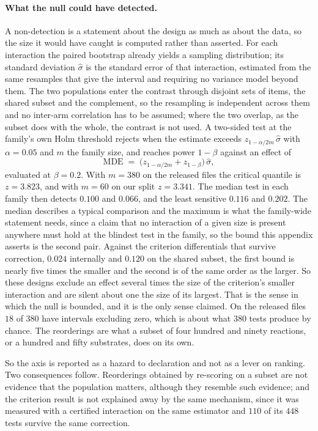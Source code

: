 \paragraph{What the null could have detected.} A non-detection is a statement about the design as
much as about the data, so the size it would have caught is computed rather than asserted. For each
interaction the paired bootstrap already yields a sampling distribution; its standard deviation
$\hat\sigma$ is the standard error of that interaction, estimated from the same resamples that give
the interval and requiring no variance model beyond them. The two populations enter the contrast
through disjoint sets of items, the shared subset and the complement, so the resampling is
independent across them and no inter-arm correlation has to be assumed; where the two overlap, as
the subset does with the whole, the contrast is not used. A two-sided test at the family's own Holm
threshold rejects when the estimate exceeds $z_{1-\alpha/2m}\,\hat\sigma$ with $\alpha=0.05$ and $m$
the family size, and reaches power $1-\beta$ against an effect of
\[
\mathrm{MDE} \;=\; \bigl(z_{1-\alpha/2m} + z_{1-\beta}\bigr)\,\hat\sigma ,
\]
evaluated at $\beta=0.2$. With $m=380$ on the released files the critical quantile is $z=3.823$, and
with $m=60$ on our split $z=3.341$. The median test in each family then detects $0.100$ and $0.066$,
and the least sensitive $0.116$ and $0.202$. The median describes a typical comparison and the
maximum is what the family-wide statement needs, since a claim that no interaction of a given size is
present anywhere must hold at the blindest test in the family, so the bound this appendix asserts is
the second pair. Against the criterion differentials that survive
correction, $0.024$ internally and $0.120$ on the shared subset, the first bound is nearly five
times the smaller and the second is of the same order as the larger. So these designs exclude an
effect several times the size of the criterion's smaller interaction and are silent about one the
size of its largest. That is the sense in which the null is bounded, and it is the only sense
claimed. On the released files $18$ of $380$ have intervals
excluding zero, which is about what $380$ tests produce by chance. The reorderings are what a subset
of four hundred and ninety reactions, or a hundred and fifty substrates, does on its own.

So the axis is reported as a hazard to declaration and not as a lever on ranking. Two consequences follow. Reorderings obtained by re-scoring on a subset are not evidence that the population matters, although they resemble such evidence; and the criterion result is not
explained away by the same mechanism, since it was measured with a certified interaction on the same
estimator and $110$ of its $448$ tests survive the same correction.

